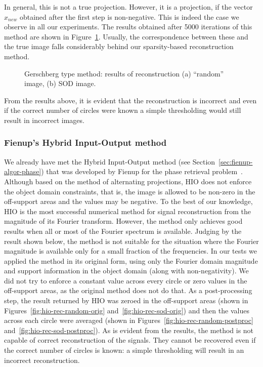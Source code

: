 In general, this is not a true projection. However, it is a
projection, if the
vector $x_{new}$ obtained after the first step is non-negative. This
is indeed the case we observe in all our experiments. The
results obtained after 5000 iterations of this method are shown in
Figure~\ref{fig:gerschberg-type-rec}. Usually, the correspondence
between these and the true image falls considerably behind our
sparsity-based reconstruction method.
\begin{figure}[H]
  \centering
  \qquad{}
  \caption[Gerschberg type method: results of reconstruction]{Gerschberg type method: results of reconstruction (a)
    ``random'' image, (b) SOD image.}
  \label{fig:gerschberg-type-rec}
\end{figure}
From the results above, it is evident that the reconstruction is
incorrect and even if the correct number of circles were known a
simple thresholding would still result in incorrect images.

\subsubsection{Fienup's Hybrid Input-Output method}
\label{sec:hybrid-input-output}
We already have met the Hybrid Input-Output method (see
Section~\ref{sec:fienup-algor-phase}) that was developed
by Fienup for the phase retrieval
problem~. Although based on the method of
alternating projections, HIO does not enforce the object domain
constraints, that is, the image is allowed to be non-zero in the
off-support areas and the values may be negative. To the best of our
knowledge, HIO is the most successful numerical method for signal
reconstruction from the magnitude of its Fourier transform. However,
the method only achieves good results when all or most of the Fourier
spectrum is available. Judging by the result shown below, the method
is not suitable for the situation where the Fourier magnitude is
available only for a small fraction of the frequencies. In our tests
we applied the method in its original form, using only the Fourier
domain magnitude and support information in the object domain (along
with non-negativity). We did not try to enforce a constant value
across every circle or zero values in the off-support areas, as the
original method does not do that. As a post-processing step, the
result returned by HIO was zeroed in the off-support areas (shown in
Figures~\ref{fig:hio-rec-random-orig} and~\ref{fig:hio-rec-sod-orig})
and then the values across each circle were averaged (shown in
Figures~\ref{fig:hio-rec-random-postproc}
and~\ref{fig:hio-rec-sod-postproc}). As is evident from the results,
the method is not capable of correct reconstruction of the
signals. They cannot be recovered even if the correct number of
circles is known: a simple thresholding will result in an incorrect
reconstruction.

